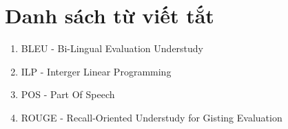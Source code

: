 \chapter*{Danh sách từ viết tắt}
\label{Appendix:Abbreviations}

\begin{enumerate}
\item BLEU - Bi-Lingual Evaluation Understudy
\item ILP - Interger Linear Programming
\item POS - Part Of Speech
\item ROUGE - Recall-Oriented Understudy for Gisting Evaluation
\end{enumerate}